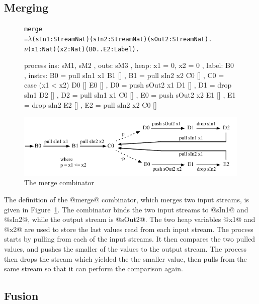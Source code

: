 \subsection{Merging}
\begin{figure}
\begin{alltt}
       merge
         = \(\lambda\) (sIn1: Stream Nat) (sIn2: Stream Nat) (sOut2: Stream Nat). 
           \(\nu\) (x1: Nat) (x2: Nat) (B0..E2: Label).
\end{alltt}
\begin{code}
           process
            { ins:    { sM1, sM2 }
            , outs:   { sM3 }
            , heap:   { x1 = 0, x2 = 0 }
            , label:  B0
            , instrs: { B0 = pull sIn1  x1   B1 []             , B1 = pull sIn2  x2   C0 []
                      , C0 = case (x1 < x2)  D0 []  E0 []      , D0 = push sOut2 x1   D1 []
                      , D1 = drop sIn1       D2 []             , D2 = pull sIn1  x1   C0 []
                      , E0 = push sOut2 x2   E1 []             , E1 = drop sIn2       E2 []
                      , E2 = pull sIn2 x2    C0 [] } }
\end{code}
\includegraphics[scale=1.0]{figures/state-merge.pdf}
\caption{The merge combinator}
\label{fig:Process:Merge}
\end{figure}

The definition of the @merge@ combinator, which merges two input streams, is given in Figure~\ref{fig:Process:Merge}. The combinator binds the two input streams to @sIn1@ and @sIn2@, while the output stream is @sOut2@. The two heap variables @x1@ and @x2@ are used to store the last values read from each input stream. The process starts by pulling from each of the input streams. It then compares the two pulled values, and pushes the smaller of the values to the output stream. The process then drops the stream which yielded the the smaller value, then pulls from the same stream so that it can perform the comparison again.


\subsection{Fusion}

